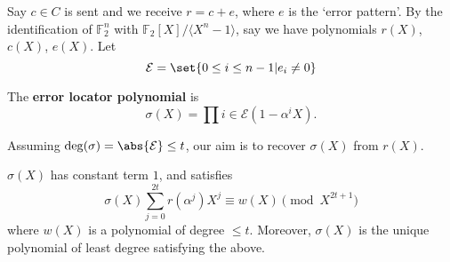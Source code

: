 \documentclass{article}
\newcommand{\F}{\mathbb{F}}
\newcommand{\1}[1]{\mathbbm{1}_{#1}}
\begin{document}
Say $c \in C$ is sent and we receive $r = c + e$, where $e$ is the `error pattern'.
By the identification of $\F_2^n$ with $\F_2[X]/\langle X^n - 1 \rangle$, say we have polynomials $r(X)$, $c(X)$, $e(X)$.
Let
\begin{equation*}
    \mathcal{E} = \set{0 \leq i \leq n-1 | e_i \neq 0}
\end{equation*}
\begin{defi}
    The \textbf{error locator polynomial} is
    \begin{equation*}
        \sigma(X) = \prod{i \in \mathcal{E}} (1 - \alpha^i X).
    \end{equation*}
\end{defi}
Assuming $\deg(\sigma) = \abs{\mathcal{E}} \leq t$, our aim is to recover $\sigma(X)$ from $r(X)$.
\begin{nthm}\label{thm:2.34}
    $\sigma(X)$ has constant term $1$, and satisfies
    \begin{equation*}
        \sigma(X) \sum_{j=0}^{2t} r(\alpha^j) X^j \equiv w(X) \pmod{X^{2t+1}}
    \end{equation*}
    where $w(X)$ is a polynomial of degree $\leq t$.
    Moreover, $\sigma(X)$ is the unique polynomial of least degree satisfying the above.
\end{nthm}
\end{document}
